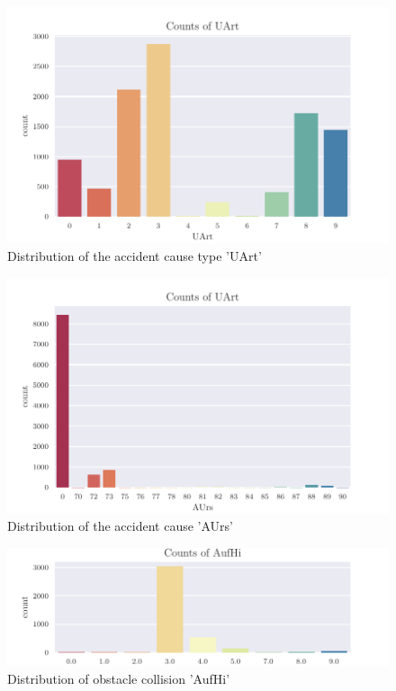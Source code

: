 \documentclass[a4paper,headsepline,footsepline,fontsize=11pt,BCOR=12mm,DIV=12]{report}
\begin{document}
\begin{appendices}
\begin{figure}[h]
	\centering
	\includegraphics[scale=1]{../CorrAnalysis/data/BAYSIS/01_dataset/plots/baysis_dataset_count_UArt}
	\caption{Distribution of the accident cause type 'UArt'}
	\label{img:appendix_baysis_dataset_UArt}
\end{figure}

\begin{figure}[h]
	\centering
	\includegraphics[scale=1]{../CorrAnalysis/data/BAYSIS/01_dataset/plots/baysis_dataset_count_AUrs}
	\caption{Distribution of the accident cause 'AUrs'}
	\label{img:appendix_baysis_dataset_AUrs}
\end{figure}

\begin{figure}[h]
	\centering
	\includegraphics[scale=1]{../CorrAnalysis/data/BAYSIS/01_dataset/plots/baysis_dataset_count_Aufhi}
	\caption{Distribution of obstacle collision 'AufHi'}
	\label{img:appendix_baysis_dataset_Aufhi}
\end{figure}


\end{appendices}
\end{document}
